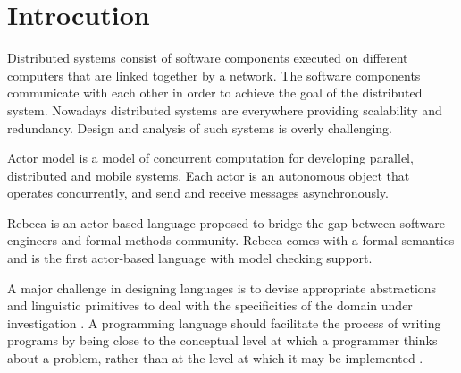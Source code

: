\section{Introcution} \label{sec::introduction}




Distributed systems consist of software components executed on different computers that are linked together by a network. The software components communicate with each other in order to achieve the goal of the distributed system.
Nowadays distributed systems are everywhere providing scalability and redundancy.  Design and analysis of such systems is overly challenging.

Actor model is a model of concurrent computation for developing parallel, distributed and mobile systems. Each actor is an autonomous object that operates concurrently, and  send and receive messages asynchronously.

Rebeca is an actor-based language proposed to bridge the gap between software engineers and formal methods community.
Rebeca comes with a formal semantics and is the first actor-based language with model checking support.


A major challenge in designing languages is to devise appropriate abstractions and linguistic primitives to deal with the specificities of the domain under investigation \cite{Rocco}.
%
A programming language should facilitate the process of writing programs by being close to the conceptual level at which a programmer thinks about a problem, rather than at the level at which it may be implemented \cite{GulKamrani}. 


